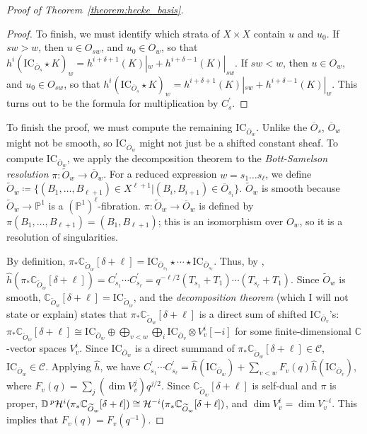 \documentclass[leqno, openany]{memoir}
\theoremstyle{definition}
\theoremstyle{remark}
\theoremstyle{plain}
\theoremstyle{definition}
\theoremstyle{remark}
\newcommand{\mr}[1]{\mathrm{#1}}
\begin{document}
\begin{proof}[Proof of Theorem~\ref{theorem:hecke_basis}]
\begin{proof}
To finish, we must identify which strata of $X \times X$ contain $u$ and $u_0$. If $sw > w$, then $u \in O_{sw}$, and $u_0 \in O_w$, so that $h^i(\mr{IC}_{\overline{O}_s} \star K)_w = h^{i + \delta + 1}(K)|_w + h^{i + \delta - 1}(K)|_{sw}$. If $sw < w$, then $u \in O_w$, and $u_0 \in O_{sw}$, so that $h^i(\mr{IC}_{\overline{O}_s} \star K)_w = h^{i + \delta + 1}(K)|_{sw} + h^{i + \delta - 1}(K)|_w$. This turns out to be the formula for multiplication by $C_s^{\prime}$.

\end{proof}

To finish the proof, we must compute the remaining $\mr{IC}_{\overline{O}_w}$. Unlike the $\overline{O}_s$, $\overline{O}_w$ might not be smooth, so $\mr{IC}_{\overline{O}_w}$ might not just be a shifted constant sheaf. To compute $\mr{IC}_{\overline{O}_w}$, we apply the decomposition theorem to the \textit{Bott-Samelson resolution} $\pi: \widetilde{O}_w \to \overline{O}_w$. For a reduced expression $w = s_1\ldots s_{\ell}$, we define $\widetilde{O}_w \coloneqq \{(B_1,\ldots,B_{\ell + 1}) \in X^{\ell + 1}|(B_i,B_{i + 1}) \in \overline{O}_{s_i}\}$. $\widetilde{O}_w$ is smooth because $\widetilde{O}_w \to \mathbb{P}^1$ is a $(\mathbb{P}^1)^{\ell}$-fibration. $\pi: \widetilde{O}_w \to \overline{O}_w$ is defined by $\pi(B_1,\ldots,B_{\ell + 1}) = (B_1,B_{\ell + 1})$; this is an isomorphism over $O_w$, so it is a resolution of singularities.

By definition, $\pi_*\mathbb{C}_{\widetilde{O}_w}[\delta + \ell] = \mr{IC}_{\overline{O}_{s_1}} \star \cdots \star \mr{IC}_{\overline{O}_{s_{\ell}}}$. Thus, by , $\widehat{h}(\pi_*\mathbb{C}_{\widetilde{O}_w}[\delta + \ell]) = C_{s_1}^{\prime}\cdots C_{s_{\ell}}^{\prime} = q^{-\ell/2}(T_{s_1} + T_1)\cdots(T_{s_{\ell}} + T_1)$. Since $\widetilde{O}_w$ is smooth, $\mathbb{C}_{\widetilde{O}_w}[\delta + \ell] = \mr{IC}_{\widetilde{O}_w}$, and the \textit{decomposition theorem} (which I will not state or explain) states that $\pi_*\mathbb{C}_{\widetilde{O}_w}[\delta + \ell]$ is a direct sum of shifted $\mr{IC}_{\overline{O}_v}$'s: $\pi_*\mathbb{C}_{\widetilde{O}_w}[\delta + \ell] \cong \mr{IC}_{\overline{O}_w} \oplus \bigoplus_{v < w}\bigoplus_i\mr{IC}_{\overline{O}_v} \otimes V_v^i[-i]$ for some finite-dimensional $\mathbb{C}$-vector spaces $V_v^i$. Since $\mr{IC}_{\overline{O}_w}$ is a direct summand of $\pi_*\mathbb{C}_{\widetilde{O}_w}[\delta + \ell] \in \mathcal{C}$, $\mr{IC}_{\overline{O}_w} \in \mathcal{C}$. Applying $\widehat{h}$, we have $C_{s_1}^{\prime}\cdots C_{s_{\ell}}^{\prime} = \widehat{h}(\mr{IC}_{\overline{O}_w}) + \sum_{v < w}F_v(q)\widehat{h}(\mr{IC}_{\overline{O}_v})$, where $F_v(q) = \sum_j(\dim V_v^j)q^{j/2}$. Since $\mathbb{C}_{\widetilde{O}_w}[\delta + \ell]$ is self-dual and $\pi$ is proper, $\mathbb{D}\prescript{p}{}{}\mathcal{H}^i(\pi_*\mathbb{C}_{\widetilde{O}_w}[\delta + \ell]) \cong \mathcal{H}^{-i}(\pi_*\mathbb{C}_{\widetilde{O}_w}[\delta + \ell])$, and $\dim V_v^i = \dim V_v^{-i}$. This implies that $F_v(q) = F_v(q^{-1})$.


\end{proof}
\end{document}
